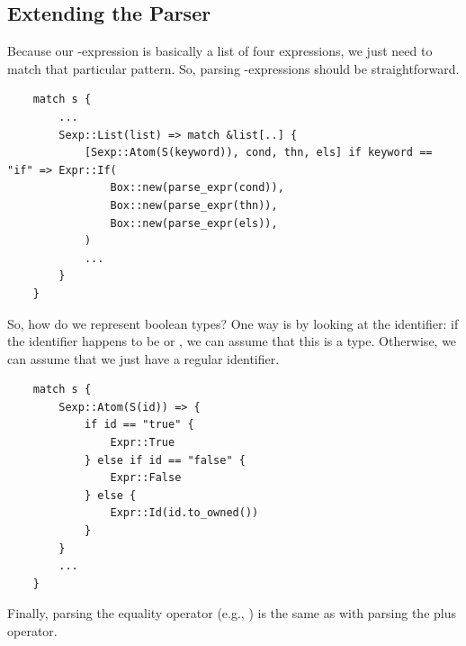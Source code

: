 \subsection{Extending the Parser}
Because our -expression is basically a list of four expressions, we just need to match that particular pattern. So, parsing -expressions should be straightforward. 
\begin{verbatim}
    match s {
        ...
        Sexp::List(list) => match &list[..] {
            [Sexp::Atom(S(keyword)), cond, thn, els] if keyword == "if" => Expr::If(
                Box::new(parse_expr(cond)),
                Box::new(parse_expr(thn)),
                Box::new(parse_expr(els)),
            )
            ...    
        }
    }\end{verbatim}
So, how do we represent boolean types? One way is by looking at the identifier: if the identifier happens to be  or , we can assume that this is a  type. Otherwise, we can assume that we just have a regular identifier.
\begin{verbatim}
    match s {
        Sexp::Atom(S(id)) => {
            if id == "true" {
                Expr::True
            } else if id == "false" {
                Expr::False
            } else {
                Expr::Id(id.to_owned())
            }
        }
        ...
    }\end{verbatim}
Finally, parsing the equality operator (e.g., ) is the same as with parsing the plus operator.

